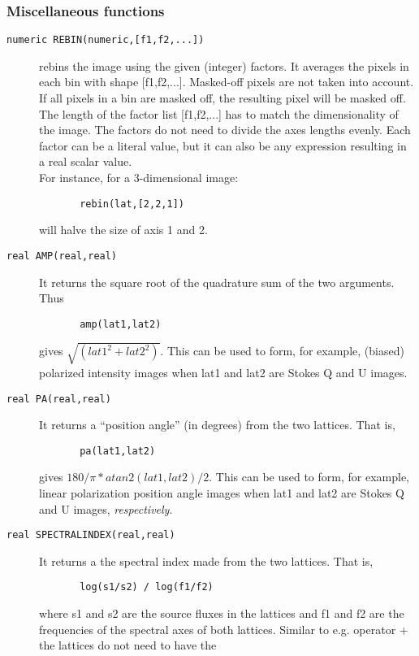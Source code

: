 \subsubsection{\label{LEL:MISCFUNCTIONS}Miscellaneous functions}
\begin{description}
  \item[ \texttt{numeric REBIN(numeric,[f1,f2,...])}]
    rebins the image using the given (integer) factors.
    It averages the pixels in each bin with shape [f1,f2,...].
    Masked-off pixels are not taken into account. If all pixels in a
    bin are masked off, the resulting pixel will be masked off.
    The length of the factor list [f1,f2,...] has to match the
    dimensionality of the image. The factors do not need to divide
    the axes lengths evenly.
    Each factor can be a literal value, but it can also be any
    expression resulting in a real scalar value.
    \\For instance, for a 3-dimensional image:
    \begin{verbatim}
       rebin(lat,[2,2,1])
    \end{verbatim}
    will halve the size of axis 1 and 2.
  \item[ \texttt{real AMP(real,real)}]
    It returns the square root of the quadrature sum of the two
    arguments.  Thus
    \begin{verbatim}
       amp(lat1,lat2)
    \end{verbatim}
    gives $\sqrt{(lat1^2+lat2^2)}$.  This can be used to form, for
    example, (biased) polarized intensity images when lat1 and lat2
    are Stokes Q and U images.
  \item[ \texttt{real PA(real,real)}]
    It returns a ``position angle'' (in degrees) from the two lattices.
    That is,
    \begin{verbatim}
       pa(lat1,lat2)
    \end{verbatim}
    gives $180/\pi*atan2(lat1,lat2)/2$.  This can be used to form, for
    example, linear polarization position angle images when
    lat1 and lat2  are Stokes Q and U images, {\it respectively}.
  \item[ \texttt{real SPECTRALINDEX(real,real)}]
    It returns a the spectral index made from the two lattices.  That is,
    \begin{verbatim}
       log(s1/s2) / log(f1/f2)
    \end{verbatim}
    where s1 and s2 are the source fluxes in the lattices and f1 and f2
    are the frequencies of the spectral axes of both lattices.
    Similar to e.g. operator + the lattices do not need to have the

\end{description}
